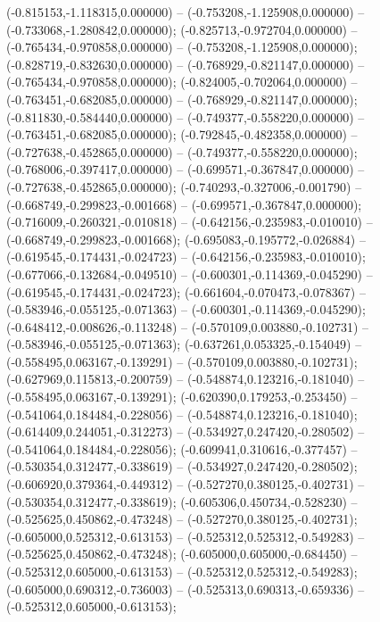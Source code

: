  (-0.815153,-1.118315,0.000000) -- (-0.753208,-1.125908,0.000000) -- (-0.733068,-1.280842,0.000000);
 (-0.825713,-0.972704,0.000000) -- (-0.765434,-0.970858,0.000000) -- (-0.753208,-1.125908,0.000000);
 (-0.828719,-0.832630,0.000000) -- (-0.768929,-0.821147,0.000000) -- (-0.765434,-0.970858,0.000000);
 (-0.824005,-0.702064,0.000000) -- (-0.763451,-0.682085,0.000000) -- (-0.768929,-0.821147,0.000000);
 (-0.811830,-0.584440,0.000000) -- (-0.749377,-0.558220,0.000000) -- (-0.763451,-0.682085,0.000000);
 (-0.792845,-0.482358,0.000000) -- (-0.727638,-0.452865,0.000000) -- (-0.749377,-0.558220,0.000000);
 (-0.768006,-0.397417,0.000000) -- (-0.699571,-0.367847,0.000000) -- (-0.727638,-0.452865,0.000000);
 (-0.740293,-0.327006,-0.001790) -- (-0.668749,-0.299823,-0.001668) -- (-0.699571,-0.367847,0.000000);
 (-0.716009,-0.260321,-0.010818) -- (-0.642156,-0.235983,-0.010010) -- (-0.668749,-0.299823,-0.001668);
 (-0.695083,-0.195772,-0.026884) -- (-0.619545,-0.174431,-0.024723) -- (-0.642156,-0.235983,-0.010010);
 (-0.677066,-0.132684,-0.049510) -- (-0.600301,-0.114369,-0.045290) -- (-0.619545,-0.174431,-0.024723);
 (-0.661604,-0.070473,-0.078367) -- (-0.583946,-0.055125,-0.071363) -- (-0.600301,-0.114369,-0.045290);
 (-0.648412,-0.008626,-0.113248) -- (-0.570109,0.003880,-0.102731) -- (-0.583946,-0.055125,-0.071363);
 (-0.637261,0.053325,-0.154049) -- (-0.558495,0.063167,-0.139291) -- (-0.570109,0.003880,-0.102731);
 (-0.627969,0.115813,-0.200759) -- (-0.548874,0.123216,-0.181040) -- (-0.558495,0.063167,-0.139291);
 (-0.620390,0.179253,-0.253450) -- (-0.541064,0.184484,-0.228056) -- (-0.548874,0.123216,-0.181040);
 (-0.614409,0.244051,-0.312273) -- (-0.534927,0.247420,-0.280502) -- (-0.541064,0.184484,-0.228056);
 (-0.609941,0.310616,-0.377457) -- (-0.530354,0.312477,-0.338619) -- (-0.534927,0.247420,-0.280502);
 (-0.606920,0.379364,-0.449312) -- (-0.527270,0.380125,-0.402731) -- (-0.530354,0.312477,-0.338619);
 (-0.605306,0.450734,-0.528230) -- (-0.525625,0.450862,-0.473248) -- (-0.527270,0.380125,-0.402731);
 (-0.605000,0.525312,-0.613153) -- (-0.525312,0.525312,-0.549283) -- (-0.525625,0.450862,-0.473248);
 (-0.605000,0.605000,-0.684450) -- (-0.525312,0.605000,-0.613153) -- (-0.525312,0.525312,-0.549283);
 (-0.605000,0.690312,-0.736003) -- (-0.525313,0.690313,-0.659336) -- (-0.525312,0.605000,-0.613153);
